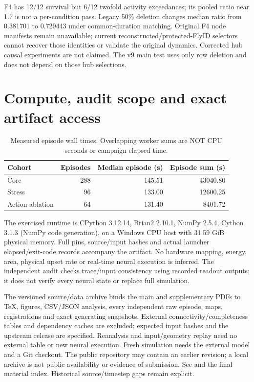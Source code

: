 \documentclass[10pt,letterpaper]{article}
\begin{document}
F4 has 12/12 survival but 6/12 twofold activity exceedances; its pooled ratio near 1.7 is not a per-condition pass. Legacy 50\% deletion changes median ratio from 0.381701 to 0.729443 under common-duration matching. Original F4 node manifests remain unavailable; current reconstructed/protected-FlyID selectors cannot recover those identities or validate the original dynamics. Corrected hub causal experiments are not claimed. The v9 main test uses only row deletion and does not depend on those hub selections.

\section{Compute, audit scope and exact artifact access}

\begin{table}[H]
\centering\small
\caption{Measured episode wall times. Overlapping worker sums are NOT CPU seconds or campaign elapsed time.}
\begin{tabular}{lrrr}
\toprule
Cohort & Episodes & Median episode (s) & Episode sum (s)\\
\midrule
Core & 288 & 145.51 & 43040.80\\
Stress & 96 & 133.00 & 12600.25\\
Action ablation & 64 & 131.40 & 8401.72\\
\bottomrule
\end{tabular}
\end{table}

The exercised runtime is CPython 3.12.14, Brian2 2.10.1, NumPy 2.5.4, Cython 3.1.3 (NumPy code generation), on a Windows CPU host with 31.59 GiB physical memory. Full pins, source/input hashes and actual launcher elapsed/exit-code records accompany the artifact. No hardware mapping, energy, area, physical upset rate or real-time neural execution is inferred. The independent audit checks trace/input consistency using recorded readout outputs; it does not verify every neural state or replace full simulation.

The versioned source/data archive binds the main and supplementary PDFs to TeX, figures, CSV/JSON analysis, every independent raw episode, maps, registrations and exact generating snapshots. External connectivity/completeness tables and dependency caches are excluded; expected input hashes and the upstream release are specified. Reanalysis and input/geometry replay need no external table or new neural execution. Fresh simulation needs the external model and a Git checkout. The public repository may contain an earlier revision; a local archive is not public availability or evidence of submission. See  and the final material index. Historical source/timestep gaps remain explicit.
\end{document}
